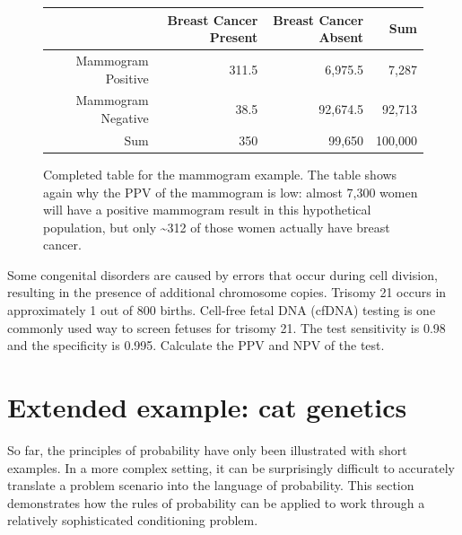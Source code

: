 \begin{figure}[ht]
	\centering
	\begin{tabular}{rrrr}
		\hline
		& Breast Cancer Present & Breast Cancer Absent & Sum \\ 
		\hline
		Mammogram Positive & 311.5 & 6,975.5 & 7,287 \\ 
		Mammogram Negative &  38.5 & 92,674.5 & 92,713 \\ 
		Sum & 350 & 99,650 & 100,000 \\ 
		\hline
	\end{tabular}
	\caption{Completed table for the mammogram example. The table shows again why the PPV of the mammogram is low: almost 7,300 women will have a positive mammogram result in this hypothetical population, but only \textasciitilde312 of those women actually have breast cancer.}
	\label{tableMammogramExample}
\end{figure}

\begin{exercisewrap}
\begin{nexercise}
Some congenital disorders are caused by errors that occur during cell division, resulting in the presence of additional chromosome copies. Trisomy 21 occurs in approximately 1 out of 800 births. Cell-free fetal DNA (cfDNA) testing is one commonly used way to screen fetuses for trisomy 21. The test sensitivity is 0.98 and the specificity is 0.995. Calculate the PPV and NPV of the test.\footnotemark{}
\end{nexercise}
\end{exercisewrap}



\section[Extended example]{Extended example: cat genetics}
\label{sectionExtendedExampleCatGenetics}

So far, the principles of probability have only been illustrated with short examples. In a more complex setting, it can be surprisingly difficult to accurately translate a problem scenario into the language of probability. This section demonstrates how the rules of probability can be applied to work through a relatively sophisticated conditioning problem.


